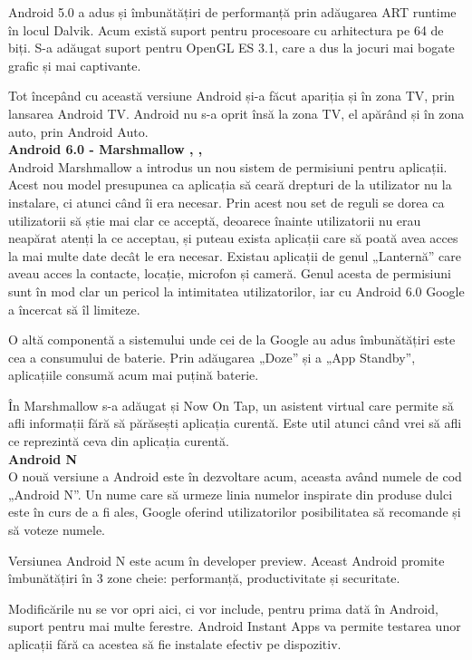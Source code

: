 \documentclass[12pt, a4paper, oneside]{article}
\begin{document}
	Android 5.0 a adus și îmbunătățiri de performanță prin adăugarea ART runtime în locul Dalvik. Acum există suport pentru procesoare cu arhitectura pe 64 de biți. S-a adăugat suport pentru OpenGL ES 3.1, care a dus la jocuri mai bogate grafic și mai captivante.
	
	Tot începând cu această versiune Android și-a făcut apariția și în zona TV, prin lansarea Android TV. Android nu s-a oprit însă la zona TV, el apărând și în zona auto, prin Android Auto.\\

\textbf{Android 6.0 - Marshmallow \cite{AndroidVersionsHistory}, \cite{AndroidHistory}, \cite{DeveloperAndroid}}\\
Android Marshmallow a introdus un nou sistem de permisiuni pentru aplicații. Acest nou model presupunea ca aplicația să ceară drepturi de la utilizator nu la instalare, ci atunci când îi era necesar. Prin acest nou set de reguli se dorea ca utilizatorii să știe mai clar ce acceptă, deoarece înainte utilizatorii nu erau neapărat atenți la ce acceptau, și puteau exista aplicații care să poată avea acces la mai multe date decât le era necesar. Existau aplicații de genul „Lanternă” care aveau acces la contacte, locație, microfon și cameră. Genul acesta de permisiuni sunt în mod clar un pericol la intimitatea utilizatorilor, iar cu Android 6.0 Google a încercat să îl limiteze.

	O altă componentă a sistemului unde cei de la Google au adus îmbunătățiri este cea a consumului de baterie. Prin adăugarea „Doze” și a „App Standby”, aplicațiile consumă acum mai puțină baterie.

	În Marshmallow s-a adăugat și Now On Tap, un asistent virtual care permite să afli informații fără să părăsești aplicația curentă. Este util atunci când vrei să afli ce reprezintă ceva din aplicația curentă.\\

\textbf{Android N \cite{DeveloperAndroid}}\\
O nouă versiune a Android este în dezvoltare acum, aceasta având numele de cod „Android N”. Un nume care să urmeze linia numelor inspirate din produse dulci este în curs de a fi ales, Google oferind utilizatorilor posibilitatea să recomande și să voteze numele.
	
	Versiunea Android N este acum în developer preview. Aceast Android promite îmbunătățiri în 3 zone cheie: performanță, productivitate și securitate.
	
	Modificările nu se vor opri aici, ci vor include, pentru prima dată în Android, suport pentru mai multe ferestre. Android Instant Apps va permite testarea unor aplicații fără ca acestea să fie instalate efectiv pe dispozitiv.\\
	
\end{document}
